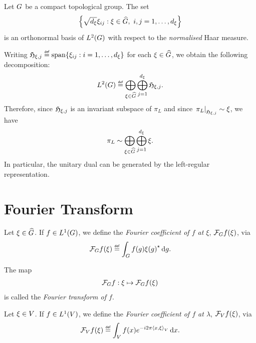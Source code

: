 \begin{theorem}
\label{theorem:Peter-Weyl_theorem}
    Let $\Group$ be a compact topological group.
    The set
    \begin{align*}
        \left\{
            \sqrt{\dimRep\xi} \xi_{ij} : \xi \in \dualGroup\Group,\ i, j = 1, \dots, \dimRep\xi
        \right\}
    \end{align*}
    is an orthonormal basis of $\Lebesgue{2}{\Group}$ with respect to the \emph{normalised} Haar measure.

    Writing $\Hilbert{\xi}{j} \defeq \Span\{\xi_{ij} : i = 1, \dots, \dimRep\xi\}$
    for each $\xi \in \dualGroup\Group$,
    we obtain the following decomposition:
    \begin{align*}
        \Lebesgue{2}{\Group} \defeq
        \bigoplus_{\xi \in \dualGroup\Group} \bigoplus_{j = 1}^{\dimRep \xi} \Hilbert{\xi}{j}.
    \end{align*}
    Therefore,
    since $\Hilbert{\xi}{j}$ is an invariant subspace of $\pi_L$
    and since $\eval{\pi_L}{\Hilbert{\xi}{j}} \sim \xi$,
    we have
    \begin{align*}
        \pi_L \sim
        \bigoplus_{\xi \in \dualGroup\Group} \bigoplus_{j = 1}^{\dimRep \xi} \xi.
    \end{align*}
    In particular, the unitary dual can be generated by the left-regular representation.
\end{theorem}

\section{Fourier Transform}

\begin{definition}
    Let $\xi \in \dualGroup\Group$.
    If $f \in \Lebesgue{1}{\Group}$,
    we define the \emph{Fourier coefficient of $f$ at $\xi$}, $\Fourier f(\xi)$, via
    \begin{align*}
        \Fourier f(\xi) \defeq \int_\Group f(g) \adj{\xi(g)} \dd g.
    \end{align*}

    The map
    \begin{align*}
        \Fourier f : \xi \mapsto \Fourier f(\xi)
    \end{align*}
    is called the \emph{Fourier transform of $f$}.
\end{definition}

\begin{definition}
    Let $\xi \in \VectorSpace$.
    If $f \in \Lebesgue{1}\VectorSpace$,
    we define the \emph{Fourier coefficient of $f$ at $\lambda$}, $\Fourier[\VectorSpace] f(\xi)$, via
    \begin{align*}
        \Fourier[\VectorSpace] f(\xi) \defeq \int_\VectorSpace f(x) \e^{-\i \turn \ip{x}\xi} \dd x.
    \end{align*}
\end{definition}

